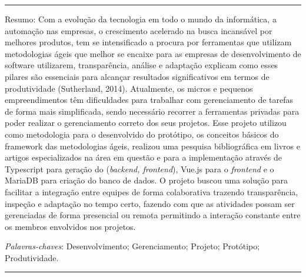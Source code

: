 \par\noindent\rule{\textwidth}{0.4pt}
\par Resumo: Com a evolução da tecnologia em todo o mundo da informática, a automação nas empresas, o crescimento acelerado na busca incansável por melhores produtos, tem se intensificado a procura por ferramentas que utilizam metodologias ágeis que melhor se encaixe para as empresas de desenvolvimento de software utilizarem, transparência, análise e adaptação explicam como esses pilares são essenciais para alcançar resultados significativos em termos de produtividade (Sutherland, 2014). Atualmente, os micros e pequenos empreendimentos têm dificuldades para trabalhar com gerenciamento de tarefas de forma mais simplificada, sendo necessário recorrer a ferramentas privadas para poder realizar o gerenciamento correto dos seus projetos.  Esse projeto utilizou como metodologia para o desenvolvido do protótipo, os conceitos básicos do framework das metodologias ágeis, realizou uma pesquisa bibliográfica em livros e artigos especializados na área em questão e para a implementação através de Typescript para geração do (\textit{backend, frontend}), Vue.js para o \textit{frontend} e o MariaDB para criação do banco de dados. O projeto buscou uma solução para facilitar a integração entre equipes de forma colaborativa trazendo transparência, inspeção e adaptação no tempo certo, fazendo com que as atividades possam ser gerenciadas de forma presencial ou remota permitindo a interação constante entre os membros envolvidos nos projetos.

\noindent\textit{Palavras-chaves}: Desenvolvimento; Gerenciamento; Projeto; Protótipo; Produtividade.

\par\noindent\rule{\textwidth}{0.4pt}